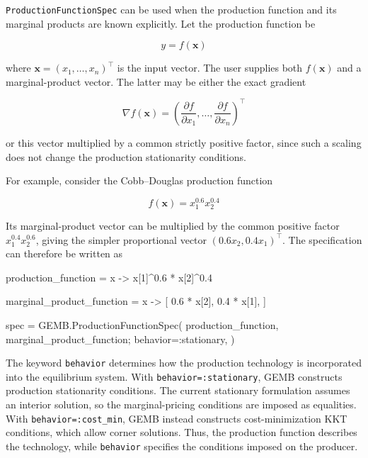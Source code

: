 \documentclass[
  letterpaper,
  DIV=11,
  numbers=noendperiod]{scrreprt}
\newenvironment{Shaded}{\begin{snugshade}}{\end{snugshade}}
\newcommand{\FloatTok}[1]{\textcolor[rgb]{0.68,0.00,0.00}{#1}}
\newcommand{\FunctionTok}[1]{\textcolor[rgb]{0.28,0.35,0.67}{#1}}
\newcommand{\NormalTok}[1]{\textcolor[rgb]{0.00,0.23,0.31}{#1}}
\newcommand{\OperatorTok}[1]{\textcolor[rgb]{0.37,0.37,0.37}{#1}}
\begin{document}
\texttt{ProductionFunctionSpec} can be used when the production function
and its marginal products are known explicitly. Let the production
function be

\[
y=f(\mathbf x)
\]

where \(\mathbf x=(x_1,\ldots,x_n)^\top\) is the input vector. The user
supplies both \(f(\mathbf x)\) and a marginal-product vector. The latter
may be either the exact gradient

\[
\nabla f(\mathbf x)
=
\left(
\frac{\partial f}{\partial x_1},
\ldots,
\frac{\partial f}{\partial x_n}
\right)^\top
\]

or this vector multiplied by a common strictly positive factor, since
such a scaling does not change the production stationarity conditions.

For example, consider the Cobb--Douglas production function

\[
f(\mathbf x)=x_1^{0.6}x_2^{0.4}
\]

Its marginal-product vector can be multiplied by the common positive
factor \(x_1^{0.4}x_2^{0.6}\), giving the simpler proportional vector
\((0.6x_2,0.4x_1)^\top\). The specification can therefore be written as

\begin{Shaded}
\begin{Highlighting}[]
\NormalTok{production\_function }\OperatorTok{=}\NormalTok{ x }\OperatorTok{{-}\textgreater{}}
\NormalTok{    x[}\FloatTok{1}\NormalTok{]}\OperatorTok{\^{}}\FloatTok{0.6} \OperatorTok{*}\NormalTok{ x[}\FloatTok{2}\NormalTok{]}\OperatorTok{\^{}}\FloatTok{0.4}

\NormalTok{marginal\_product\_function }\OperatorTok{=}\NormalTok{ x }\OperatorTok{{-}\textgreater{}}\NormalTok{ [}
    \FloatTok{0.6} \OperatorTok{*}\NormalTok{ x[}\FloatTok{2}\NormalTok{],}
    \FloatTok{0.4} \OperatorTok{*}\NormalTok{ x[}\FloatTok{1}\NormalTok{],}
\NormalTok{]}

\NormalTok{spec }\OperatorTok{=}\NormalTok{ GEMB.}\FunctionTok{ProductionFunctionSpec}\NormalTok{(}
\NormalTok{    production\_function,}
\NormalTok{    marginal\_product\_function;}
\NormalTok{    behavior}\OperatorTok{=:}\NormalTok{stationary,}
\NormalTok{)}
\end{Highlighting}
\end{Shaded}

The keyword \texttt{behavior} determines how the production technology
is incorporated into the equilibrium system. With
\texttt{behavior=:stationary}, GEMB constructs production stationarity
conditions. The current stationary formulation assumes an interior
solution, so the marginal-pricing conditions are imposed as equalities.
With \texttt{behavior=:cost\_min}, GEMB instead constructs
cost-minimization KKT conditions, which allow corner solutions. Thus,
the production function describes the technology, while
\texttt{behavior} specifies the conditions imposed on the producer.
\end{document}

